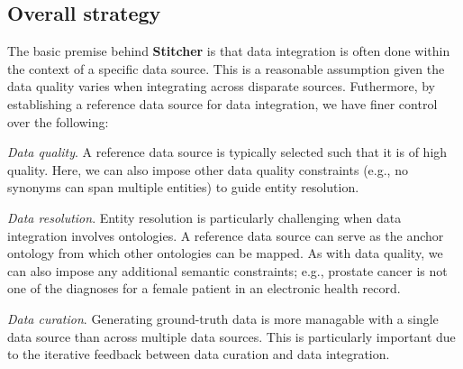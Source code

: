\documentclass{bioinfo}
\newcommand\st{\textbf{Stitcher}}
\begin{document}
\subsection{Overall strategy}
The basic premise behind \st{} is that data integration is often done within the context of a specific data source. This is a reasonable assumption given the data quality varies when integrating across disparate sources. Futhermore, by establishing a reference data source for data integration, we have finer control over the following:
\begin{unlist}
\item{\emph{Data quality}.} A reference data source is typically selected such that it is of high quality. Here, we can also impose other data quality constraints (e.g., no synonyms can span multiple entities) to guide entity resolution.
\item{\emph{Data resolution}.} Entity resolution is particularly challenging when data integration involves ontologies. A reference data source can serve as the anchor ontology from which other ontologies can be mapped. As with data quality, we can also impose any additional semantic constraints; e.g., prostate cancer is not one of the diagnoses for a female patient in an electronic health record.
\item{\emph{Data curation}.} Generating ground-truth data is more managable with a single data source than across multiple data sources. This is particularly important due to the iterative feedback between data curation and data integration.
\end{unlist}
\end{document}
